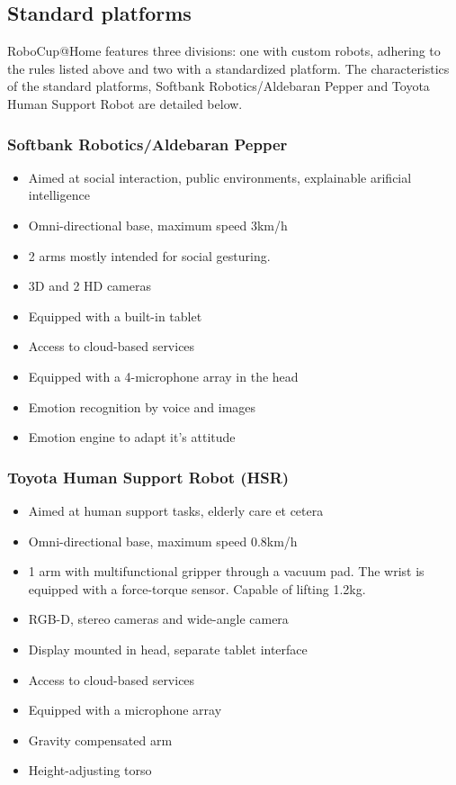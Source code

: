 \subsection{Standard platforms}
\label{rule:standard_platforms}
RoboCup@Home features three divisions: one with custom robots, adhering to the rules listed above and two with a standardized platform. 
The characteristics of the standard platforms, Softbank Robotics/Aldebaran Pepper and Toyota Human Support Robot are detailed below. 

\subsubsection{Softbank Robotics/Aldebaran Pepper}
\begin{itemize}
 \item Aimed at social interaction, public environments, explainable arificial intelligence
 \item Omni-directional base, maximum speed 3km/h
 \item 2 arms mostly intended for social gesturing. 
 \item 3D and 2 HD cameras
 \item Equipped with a built-in tablet
 \item Access to cloud-based services
 \item Equipped with a 4-microphone array in the head
 \item Emotion recognition by voice and images
 \item Emotion engine to adapt it's attitude
\end{itemize}

\subsubsection{Toyota Human Support Robot (HSR)}
\begin{itemize}
 \item Aimed at human support tasks, elderly care et cetera
 \item Omni-directional base, maximum speed 0.8km/h
 \item 1 arm with multifunctional gripper through a vacuum pad. The wrist is equipped with a force-torque sensor. Capable of lifting 1.2kg. 
 \item RGB-D, stereo cameras and wide-angle camera
 \item Display mounted in head, separate tablet interface
 \item Access to cloud-based services
 \item Equipped with a microphone array
 \item Gravity compensated arm
 \item Height-adjusting torso
\end{itemize}



